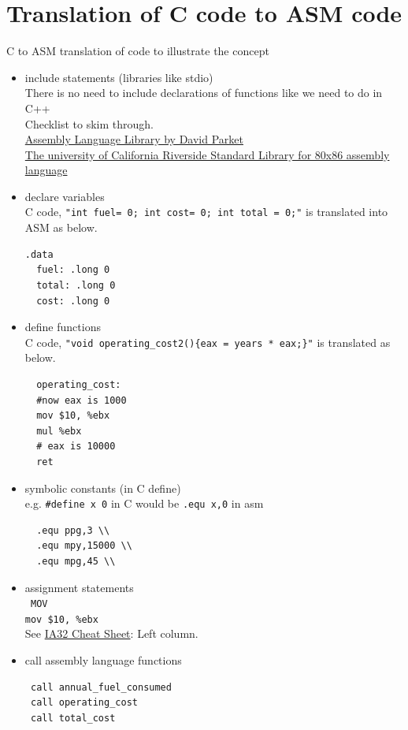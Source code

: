 \documentclass{article}
\begin{document}
\section*{Translation of C code to ASM code}
\hypertarget{6}{C to ASM translation of code to illustrate the concept}
\begin{itemize}
\item 
include statements (libraries like stdio) \\
There is no need to include declarations of functions like we need to do in C++ \\
Checklist to skim through. \\
\href{http://goo.gl/UTS9OT}{Assembly Language Library by David Parket} \\
\href{http://goo.gl/EenLOf}{The university of California Riverside Standard Library for 80x86 assembly language}
\item declare variables \\
C code, \verb|"int fuel= 0; int cost= 0; int total = 0;"| is translated into ASM as below. 
\begin{verbatim}
.data
  fuel: .long 0
  total: .long 0
  cost: .long 0
\end{verbatim}
\item 
define functions \\
C code, \verb|"void operating_cost2(){eax = years * eax;}"| is translated as below. 
\begin{verbatim}  
  operating_cost:
  #now eax is 1000
  mov $10, %ebx
  mul %ebx 
  # eax is 10000
  ret
\end{verbatim}
\item 
symbolic constants (in C define) \\
e.g. \verb|#define x 0| in C would be \verb|.equ x,0| in asm
\begin{verbatim}  
  .equ ppg,3 \\
  .equ mpy,15000 \\
  .equ mpg,45 \\
\end{verbatim}
\item 
assignment statements\\
\verb| MOV| \\
\verb|mov $10, %ebx| \\
See \href{http://goo.gl/z4R9io}{IA32 Cheat Sheet}: Left column.
\item 
call assembly language functions
\begin{verbatim}  
 call annual_fuel_consumed
 call operating_cost
 call total_cost

\end{verbatim}
\end{itemize}
\end{document}
